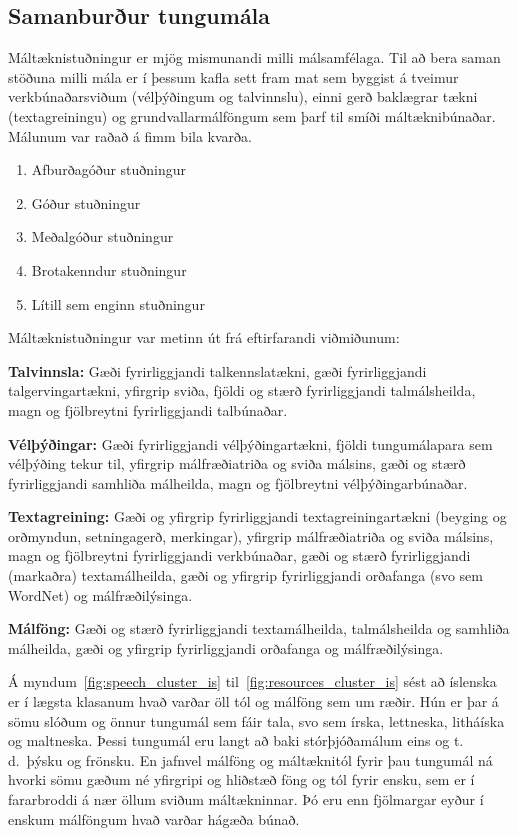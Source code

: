 \documentclass{../../metanetpaper}
\begin{document}
\begin{multicols}{2}
\subsection{Samanburður tungumála}

Máltæknistuðningur er mjög mismunandi milli málsamfélaga. Til að bera saman stöðuna milli mála er í þessum kafla sett fram mat sem byggist á tveimur verkbúnaðarsviðum (vélþýðingum og talvinnslu), einni gerð baklægrar tækni (textagreiningu) og grundvallarmálföngum sem þarf til smíði máltæknibúnaðar. Málunum var raðað á fimm bila kvarða.

\begin{enumerate}
\item Afburðagóður stuðningur
\item Góður stuðningur
\item Meðalgóður stuðningur
\item Brotakenndur stuðningur
\item Lítill sem enginn stuðningur
\end{enumerate}

Máltæknistuðningur var metinn út frá eftirfarandi viðmiðunum: 

\textbf{Talvinnsla:} Gæði fyrirliggjandi talkennslatækni, gæði fyrirliggjandi talgervingartækni, yfirgrip sviða, fjöldi og stærð fyrirliggjandi talmálsheilda, magn og fjölbreytni fyrirliggjandi talbúnaðar.

\textbf{Vélþýðingar:} Gæði fyrirliggjandi vélþýðingartækni, fjöldi tungumálapara sem vélþýðing tekur til, yfirgrip málfræðiatriða og sviða málsins, gæði og stærð fyrirliggjandi samhliða málheilda, magn og fjölbreytni vélþýðingarbúnaðar.

\textbf{Textagreining:} Gæði og yfirgrip fyrirliggjandi textagreiningartækni (beyging og orðmyndun, setningagerð, merkingar), yfirgrip málfræðiatriða og sviða málsins, magn og fjölbreytni fyrirliggjandi verkbúnaðar, gæði og stærð fyrirliggjandi (markaðra) textamálheilda, gæði og yfirgrip fyrirliggjandi orðafanga (svo sem WordNet) og málfræðilýsinga.

\textbf{Málföng:} Gæði og stærð fyrirliggjandi textamálheilda, talmálsheilda og samhliða málheilda, gæði og yfirgrip fyrirliggjandi orðafanga og málfræðilýsinga. 

Á myndum~\ref{fig:speech_cluster_is} til~\ref{fig:resources_cluster_is} sést að íslenska er í lægsta klasanum hvað varðar öll tól og málföng sem um ræðir. Hún er þar á sömu slóðum og önnur tungumál sem fáir tala, svo sem írska, lettneska, litháíska og maltneska. Þessi tungumál eru langt að baki stórþjóðamálum eins og t.\,d.~þýsku og frönsku. En jafnvel málföng og máltæknitól fyrir þau tungumál ná hvorki sömu gæðum né yfirgripi og hliðstæð föng og tól fyrir ensku, sem er í fararbroddi á nær öllum sviðum máltækninnar. Þó eru enn fjölmargar eyður í enskum málföngum hvað varðar hágæða búnað.


\end{multicols}
\end{document}
